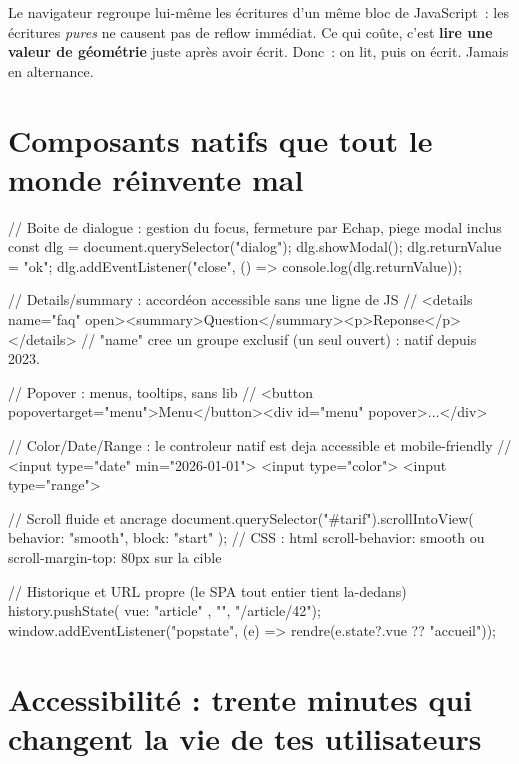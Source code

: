 \documentclass[12pt,a4paper,twoside,openright]{book}
\begin{document}
\begin{note}
Le navigateur regroupe lui-m\^eme les \'ecritures d'un m\^eme bloc de JavaScript~: les \'ecritures
\emph{pures} ne causent pas de reflow imm\'ediat. Ce qui co\^ute, c'est \textbf{lire une valeur de
g\'eom\'etrie} juste apr\`es avoir \'ecrit. Donc~: on lit, puis on \'ecrit. Jamais en alternance.
\end{note}

\section{Composants natifs que tout le monde r\'einvente mal}

\begin{codejs}
// Boite de dialogue : gestion du focus, fermeture par Echap, piege modal inclus
const dlg = document.querySelector("dialog");
dlg.showModal();
dlg.returnValue = "ok";
dlg.addEventListener("close", () => console.log(dlg.returnValue));

// Details/summary : accord\'eon accessible sans une ligne de JS
// <details name="faq" open><summary>Question</summary><p>Reponse</p></details>
// "name" cree un groupe exclusif (un seul ouvert) : natif depuis 2023.

// Popover : menus, tooltips, sans lib
// <button popovertarget="menu">Menu</button><div id="menu" popover>...</div>

// Color/Date/Range : le controleur natif est deja accessible et mobile-friendly
// <input type="date" min="2026-01-01"> <input type="color"> <input type="range">

// Scroll fluide et ancrage
document.querySelector("#tarif").scrollIntoView({ behavior: "smooth", block: "start" });
// CSS : html { scroll-behavior: smooth }  ou  scroll-margin-top: 80px sur la cible

// Historique et URL propre (le SPA tout entier tient la-dedans)
history.pushState({ vue: "article" }, "", "/article/42");
window.addEventListener("popstate", (e) => rendre(e.state?.vue ?? "accueil"));
\end{codejs}

\section{Accessibilit\'e : trente minutes qui changent la vie de tes utilisateurs}
\end{document}
